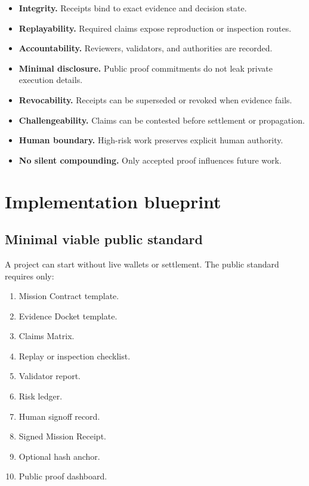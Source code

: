 \begin{itemize}
  \item \textbf{Integrity.} Receipts bind to exact evidence and decision state.
  \item \textbf{Replayability.} Required claims expose reproduction or inspection routes.
  \item \textbf{Accountability.} Reviewers, validators, and authorities are recorded.
  \item \textbf{Minimal disclosure.} Public proof commitments do not leak private execution details.
  \item \textbf{Revocability.} Receipts can be superseded or revoked when evidence fails.
  \item \textbf{Challengeability.} Claims can be contested before settlement or propagation.
  \item \textbf{Human boundary.} High-risk work preserves explicit human authority.
  \item \textbf{No silent compounding.} Only accepted proof influences future work.
\end{itemize}

\section{Implementation blueprint}

\subsection{Minimal viable public standard}

A project can start without live wallets or settlement. The public standard requires only:

\begin{enumerate}
  \item Mission Contract template.
  \item Evidence Docket template.
  \item Claims Matrix.
  \item Replay or inspection checklist.
  \item Validator report.
  \item Risk ledger.
  \item Human signoff record.
  \item Signed Mission Receipt.
  \item Optional hash anchor.
  \item Public proof dashboard.
\end{enumerate}


